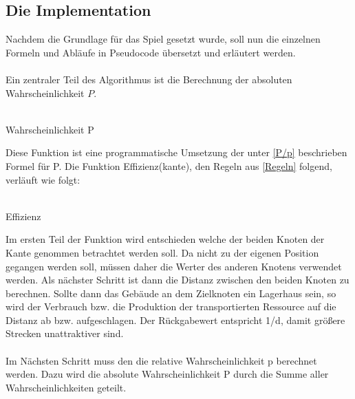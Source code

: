 \documentclass[12pt]{article}
\begin{document}
\subsection{Die Implementation}
Nachdem die Grundlage für das Spiel gesetzt wurde, soll nun die einzelnen Formeln und Abläufe in Pseudocode übersetzt und erläutert werden. \\\\
Ein zentraler Teil des Algorithmus ist die Berechnung der absoluten Wahrscheinlichkeit $P$. \\\\
\begin{algorithm}[H]
 \caption{Wahrscheinlichkeit P}
 \DontPrintSemicolon

\end{algorithm}
Diese Funktion ist eine programmatische Umsetzung der unter \ref{P/p} beschrieben Formel für P.
Die Funktion Effizienz(kante), den Regeln aus \ref{Regeln}  folgend, verläuft wie folgt:\\\\
\begin{algorithm}[H]
\caption{Effizienz}
\DontPrintSemicolon
{}
\end{algorithm}
Im ersten Teil der Funktion wird entschieden welche der beiden Knoten der Kante genommen betrachtet werden soll. Da nicht zu der eigenen Position gegangen werden soll, müssen daher die Werter des anderen Knotens verwendet werden. Als nächster Schritt ist dann die Distanz zwischen den beiden Knoten zu berechnen. Sollte dann das Gebäude an dem Zielknoten ein Lagerhaus sein, so wird der Verbrauch bzw. die Produktion der transportierten Ressource auf die Distanz ab bzw. aufgeschlagen. 
Der Rückgabewert entspricht 1/d, damit größere Strecken unattraktiver sind.\\\\
Im Nächsten Schritt muss den die relative Wahrscheinlichkeit p berechnet werden. Dazu wird die absolute Wahrscheinlichkeit P durch die Summe aller Wahrscheinlichkeiten geteilt.\\\\
\end{document}
